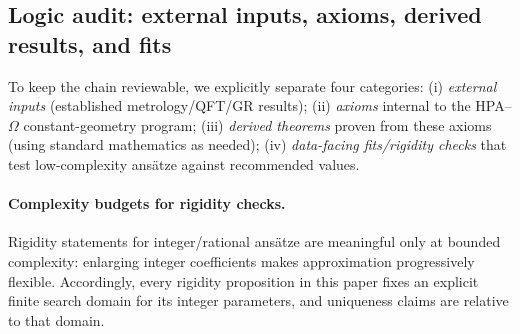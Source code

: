 \subsection{Logic audit: external inputs, axioms, derived results, and fits}
\label{subsec:logic_audit}
To keep the chain reviewable, we explicitly separate four categories:
(i) \emph{external inputs} (established metrology/QFT/GR results);
(ii) \emph{axioms} internal to the HPA--$\Omega$ constant-geometry program;
(iii) \emph{derived theorems} proven from these axioms (using standard mathematics as needed);
(iv) \emph{data-facing fits/rigidity checks} that test low-complexity ans\"atze against recommended values.

\paragraph{Complexity budgets for rigidity checks.}
Rigidity statements for integer/rational ans\"atze are meaningful only at bounded complexity: enlarging integer coefficients makes approximation progressively flexible. Accordingly, every rigidity proposition in this paper fixes an explicit finite search domain for its integer parameters, and uniqueness claims are relative to that domain.

